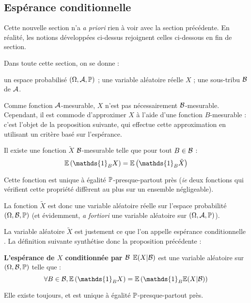 \documentclass[../integ-proba.tex]{subfiles}
\begin{document}
    \subsection{Espérance conditionnelle}

    Cette nouvelle section n'a \textit{a priori} rien à voir avec la section précédente.
    En réalité, les notions développées ci-dessus rejoignent celles ci-dessous en fin de section.

    Dans toute cette section, on se donne :
    \begin{itemize}
        \itemb un espace probabilisé $\left( \Omega, \mathcal{A}, \mathbb{P} \right)$ ;
        \itemb une variable aléatoire réelle $X$ ;
        \itemb une sous-tribu $\mathcal{B}$ de $\mathcal{A}$.
    \end{itemize}

    Comme fonction $\mathcal{A}$-mesurable, $X$ n'est pas nécessairement $\mathcal{B}$-mesurable.
    Cependant, il est commode \og d'approximer \fg{} $X$ à l'aide d'une fonction $B$-mesurable : c'est l'objet de la proposition suivante, qui effectue cette \og approximation \fg{} en utilisant un critère basé sur l'espérance.

    \begin{prop}
        Il existe une fonction $\tilde{X}$ $\mathcal{B}$-mesurable telle que pour tout $B \in \mathcal{B}$ :
        \begin{displaymath}
            \esp\left( \mathds{1}_B X \right) = \esp\left( \mathds{1}_B \tilde{X} \right)
        \end{displaymath}

        Cette fonction est unique à égalité $\mathbb{P}$-presque-partout près (\textit{ie} deux fonctions qui vérifient cette propriété diffèrent au plus sur un ensemble négligeable).
    \end{prop}

    \begin{rem}
        La fonction $\tilde{X}$ est donc une variable aléatoire réelle sur l'espace probabilité $\left( \Omega, \mathcal{B}, \mathbb{P} \right)$ (et évidemment, \textit{a fortiori} une variable aléatoire sur $\left( \Omega, \mathcal{A}, \mathbb{P} \right)$).
    \end{rem}

    La variable aléatoire $\tilde{X}$ est justement ce que l'on appelle \og espérance conditionnelle \fg.
    La définition suivante synthétise donc la proposition précédente :

    \begin{defi}
        \textbf{L'espérance de $X$ conditionnée par $\mathcal{B}$ $\mathbb{E}(X | \mathcal{B})$} est une variable aléatoire sur $\left( \Omega, \mathcal{B}, \mathbb{P} \right)$ telle que :
        \begin{displaymath}
            \forall B \in \B, \esp\left( \mathds{1}_B X \right) = \esp\left( \mathds{1}_B \esp(X | \B) \right)
        \end{displaymath}

        Elle existe toujours, et est unique à égalité $\mathbb{P}$-presque-partout près.
    \end{defi}
\end{document}
